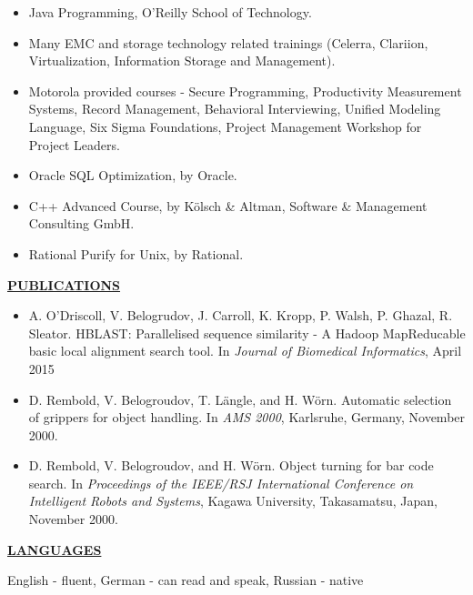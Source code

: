 \documentclass[a4paper,12pt,]{article}
\begin{document}
  \begin{itemize}
  
  \item Java Programming, O'Reilly School of Technology.
 
  \item Many EMC and storage technology related trainings (Celerra, Clariion, Virtualization, Information Storage and Management).

  \item Motorola provided courses - Secure Programming, Productivity Measurement Systems,
        Record Management, Behavioral Interviewing, Unified Modeling Language, 
        Six Sigma Foundations, Project Management Workshop for Project Leaders.
 
  \item Oracle SQL Optimization, by Oracle.
    
  \item C++ Advanced Course, by K\"{o}lsch \& Altman, Software \& Management Consulting GmbH.
   
  \item Rational Purify for Unix, by Rational.

  \end{itemize}

  \vspace{1ex}

  \uline{ \bfseries{PUBLICATIONS} }

  \begin{itemize}
    \item A. O'Driscoll, V. Belogrudov, J. Carroll, K. Kropp, P. Walsh, P. Ghazal, R. Sleator.
      HBLAST: Parallelised sequence similarity - A Hadoop MapReducable basic local alignment search tool. In \textsl{Journal of Biomedical Informatics}, April 2015

    \item D. Rembold, V. Belogroudov, T. L\"{a}ngle, and H. W\"{o}rn. 
      Automatic selection of grippers for object handling. In \textsl{AMS 2000}, 
      Karlsruhe, Germany, November 2000.
      
    \item D. Rembold, V. Belogroudov, and H. W\"{o}rn. Object turning for bar code
      search. In \textsl{Proceedings of the IEEE/RSJ International Conference on
      Intelligent Robots and Systems}, Kagawa University, Takasamatsu, Japan,
      November 2000.

  \end{itemize}

  \vspace{1ex}

  \uline{ \bfseries {LANGUAGES} }

  \vspace{2ex}
  English - fluent, German - can read and speak, Russian - native
    
\end{document}

